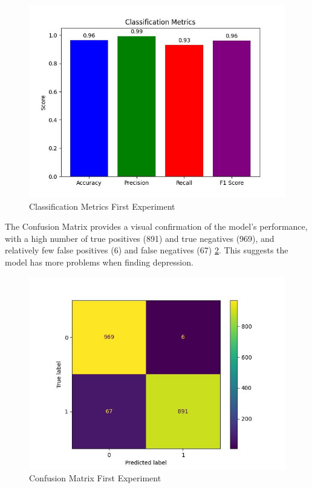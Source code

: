 \begin{figure}[htbp]
	\centering
		\includegraphics[scale=0.8]{LaTeX Bachelor Thesis Depression Signs Detection/figures/metrics/experiment1English/classificationMetrics.jpg}
	\caption{Classification Metrics First Experiment}
	\label{classificationMetricsFirstExperiment}
\end{figure}

The Confusion Matrix provides a visual confirmation of the model's performance, with a high number of true positives (891) and true negatives (969), and relatively few false positives (6) and false negatives (67) \ref{confusionMatrixFirstExperiment}. This suggests the model has more problems when finding depression.

\begin{figure}[htbp]
	\centering
		\includegraphics[scale=0.8]{LaTeX Bachelor Thesis Depression Signs Detection/figures/metrics/experiment1English/confusionMatrix.jpg}
	\caption{Confusion Matrix First Experiment}
	\label{confusionMatrixFirstExperiment}
\end{figure}

